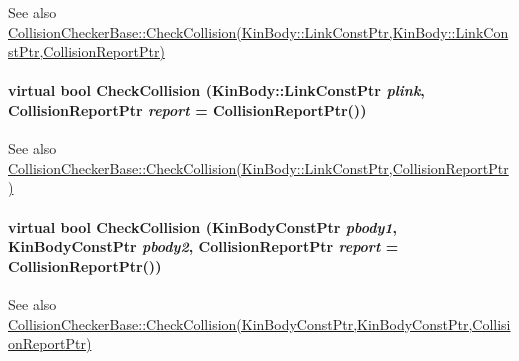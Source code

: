 \label{classOpenRAVE_1_1EnvironmentBase_abc391362f1952f15cd5a27fdd9b8a65d}
\begin{DoxySeeAlso}{See also}
\hyperlink{classOpenRAVE_1_1CollisionCheckerBase_abc391362f1952f15cd5a27fdd9b8a65d}{CollisionCheckerBase::CheckCollision(KinBody::LinkConstPtr,KinBody::LinkConstPtr,CollisionReportPtr)} 
\end{DoxySeeAlso}
\hypertarget{classOpenRAVE_1_1EnvironmentBase_ac4d2da56daf4dbd95074bf2dd72974a9}{
\paragraph[{CheckCollision}]{\setlength{\rightskip}{0pt plus 5cm}virtual bool CheckCollision (KinBody::LinkConstPtr {\em plink}, \/  CollisionReportPtr {\em report} = {\ttfamily CollisionReportPtr()})}\hfill}
\label{classOpenRAVE_1_1EnvironmentBase_ac4d2da56daf4dbd95074bf2dd72974a9}
\begin{DoxySeeAlso}{See also}
\hyperlink{classOpenRAVE_1_1CollisionCheckerBase_ac4d2da56daf4dbd95074bf2dd72974a9}{CollisionCheckerBase::CheckCollision(KinBody::LinkConstPtr,CollisionReportPtr)} 
\end{DoxySeeAlso}
\hypertarget{classOpenRAVE_1_1EnvironmentBase_ab286174aabc8a0e8b090b25963a531b3}{
\paragraph[{CheckCollision}]{\setlength{\rightskip}{0pt plus 5cm}virtual bool CheckCollision (KinBodyConstPtr {\em pbody1}, \/  KinBodyConstPtr {\em pbody2}, \/  CollisionReportPtr {\em report} = {\ttfamily CollisionReportPtr()})}\hfill}
\label{classOpenRAVE_1_1EnvironmentBase_ab286174aabc8a0e8b090b25963a531b3}
\begin{DoxySeeAlso}{See also}
\hyperlink{classOpenRAVE_1_1CollisionCheckerBase_ab286174aabc8a0e8b090b25963a531b3}{CollisionCheckerBase::CheckCollision(KinBodyConstPtr,KinBodyConstPtr,CollisionReportPtr)} 
\end{DoxySeeAlso}
